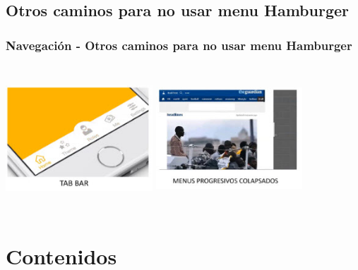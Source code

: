 \documentclass[11pt]{beamer}
\begin{document}
\subsection{Otros caminos para no usar menu Hamburger}
\begin{frame}
\frametitle{Navegación - Otros caminos para no usar menu Hamburger}
\begin{multicols}{2}
\includegraphics[width=5.5cm,height=5.5cm]{img/tabbar.jpg}
\columnbreak
\includegraphics[width=5.5cm,height=5.5cm]{img/colapsados.jpg}
\end{multicols}
\end{frame}

\section{Contenidos}
\end{document}
